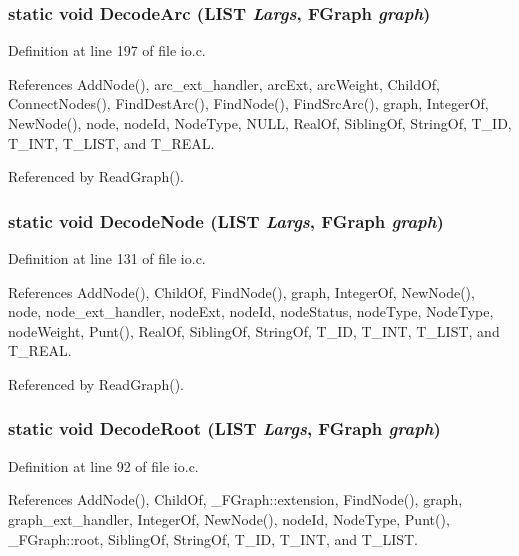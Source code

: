 \subsubsection{\setlength{\rightskip}{0pt plus 5cm}static void Decode\-Arc (\bf{LIST} {\em Largs}, \bf{FGraph} {\em graph})\hspace{0.3cm}{\tt  [static]}}\label{io_8c_8d7d9d74a9833ab75bfcb7724c17f69e}




Definition at line 197 of file io.c.

References Add\-Node(), arc\_\-ext\_\-handler, arc\-Ext, arc\-Weight, Child\-Of, Connect\-Nodes(), Find\-Dest\-Arc(), Find\-Node(), Find\-Src\-Arc(), graph, Integer\-Of, New\-Node(), node, node\-Id, Node\-Type, NULL, Real\-Of, Sibling\-Of, String\-Of, T\_\-ID, T\_\-INT, T\_\-LIST, and T\_\-REAL.

Referenced by Read\-Graph().
\subsubsection{\setlength{\rightskip}{0pt plus 5cm}static void Decode\-Node (\bf{LIST} {\em Largs}, \bf{FGraph} {\em graph})\hspace{0.3cm}{\tt  [static]}}\label{io_8c_415c82069d78dfdc0c017d0ce3745283}




Definition at line 131 of file io.c.

References Add\-Node(), Child\-Of, Find\-Node(), graph, Integer\-Of, New\-Node(), node, node\_\-ext\_\-handler, node\-Ext, node\-Id, node\-Status, node\-Type, Node\-Type, node\-Weight, Punt(), Real\-Of, Sibling\-Of, String\-Of, T\_\-ID, T\_\-INT, T\_\-LIST, and T\_\-REAL.

Referenced by Read\-Graph().
\subsubsection{\setlength{\rightskip}{0pt plus 5cm}static void Decode\-Root (\bf{LIST} {\em Largs}, \bf{FGraph} {\em graph})\hspace{0.3cm}{\tt  [static]}}\label{io_8c_d39521d22e57326537e55298f877d87b}




Definition at line 92 of file io.c.

References Add\-Node(), Child\-Of, \_\-FGraph::extension, Find\-Node(), graph, graph\_\-ext\_\-handler, Integer\-Of, New\-Node(), node\-Id, Node\-Type, Punt(), \_\-FGraph::root, Sibling\-Of, String\-Of, T\_\-ID, T\_\-INT, and T\_\-LIST.

